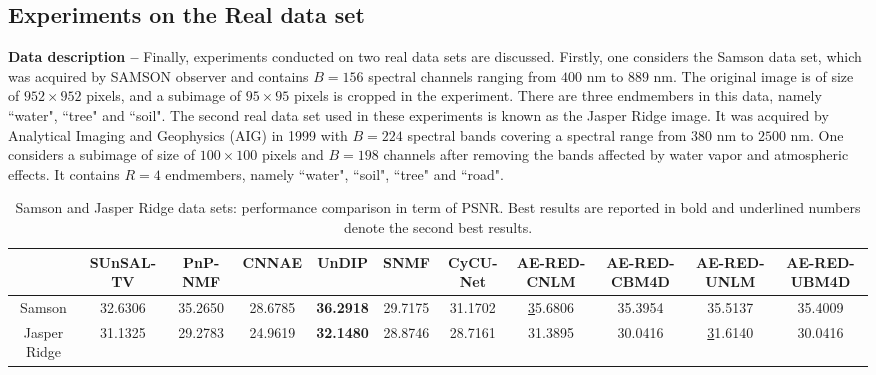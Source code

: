 \documentclass[journal,a4paper]{IEEEtran}
\begin{document}
\subsection{Experiments on the Real data set}\label{subsec:expe_real}
\noindent \textbf{Data description --} Finally, experiments conducted on  two real data sets are discussed. Firstly, one considers the Samson data set, which was acquired by SAMSON observer and contains $B=156$ spectral channels ranging from $400$ nm to $889$ nm. The original image is of size of $952\times 952$ pixels, and a subimage of $95\times 95$ pixels is cropped in the experiment.  There are three endmembers in this data, namely ``water", ``tree" and ``soil". The second real data set used in these experiments is known as the Jasper Ridge image. It was acquired by Analytical Imaging and Geophysics (AIG) in 1999 with $B=224$ spectral bands covering a spectral range from $380$ nm to $2500$ nm. One considers a subimage of size of $100\times 100$ pixels and $B=198$ channels  after removing the bands affected by water vapor and atmospheric effects. It contains $R=4$ endmembers, namely ``water", ``soil", ``tree" and ``road".\\

\setlength{\tabcolsep}{3pt}
\begin{table*}[h]
\scriptsize
\centering
\renewcommand\arraystretch{1.5}
\caption{Samson and Jasper Ridge data sets: performance comparison in term of PSNR. Best results are reported in bold and underlined numbers denote the second best results.}\label{Tab_samson_results}
\begin{tabular}{c|c|c|c|c|c|c|c|c|c|c}
\hline\hline
 & SUnSAL-TV & PnP-NMF & CNNAE & UnDIP & SNMF & CyCU-Net & AE-RED-CNLM & AE-RED-CBM4D & AE-RED-UNLM & AE-RED-UBM4D \\ \hline
Samson & 32.6306 & 35.2650 & 28.6785 & \textbf{36.2918} & 29.7175 & 31.1702 & {\ul 35.6806} & 35.3954 & 35.5137 & 35.4009 \\ \hline
Jasper Ridge & {31.1325} & 29.2783 & 24.9619 & \textbf{32.1480} & 28.8746 & 28.7161 & 31.3895 & 30.0416 & {\ul 31.6140} & 30.0416 \\ \hline\hline
\end{tabular}
\end{table*}
\end{document}
